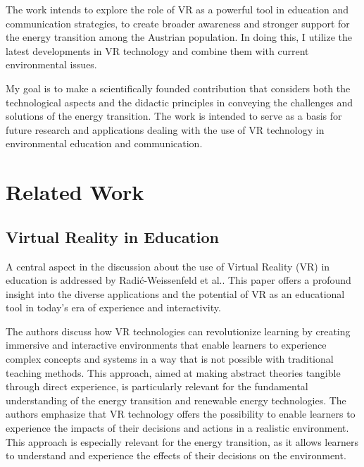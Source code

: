 \documentclass[draft, final]{vutinfth} %
\begin{document}
The work intends to explore the role of VR as a powerful tool in education and communication strategies, to create broader awareness and stronger support for the energy transition among the Austrian population. In doing this, I utilize the latest developments in VR technology and combine them with current environmental issues.

My goal is to make a scientifically founded contribution that considers both the technological aspects and the didactic principles in conveying the challenges and solutions of the energy transition. The work is intended to serve as a basis for future research and applications dealing with the use of VR technology in environmental education and communication.






\chapter{Related Work}


\section{Virtual Reality in Education}

A central aspect in the discussion about the use of Virtual Reality (VR) in education is addressed by Radić-Weissenfeld et al.\cite{hu2017virtual}. This paper offers a profound insight into the diverse applications and the potential of VR as an educational tool in today's era of experience and interactivity.

The authors discuss how VR technologies can revolutionize learning by creating immersive and interactive environments that enable learners to experience complex concepts and systems in a way that is not possible with traditional teaching methods. This approach, aimed at making abstract theories tangible through direct experience, is particularly relevant for the fundamental understanding of the energy transition and renewable energy technologies. The authors emphasize that VR technology offers the possibility to enable learners to experience the impacts of their decisions and actions in a realistic environment. This approach is especially relevant for the energy transition, as it allows learners to understand and experience the effects of their decisions on the environment.
\end{document}

